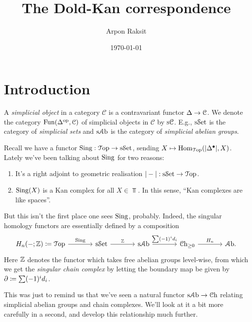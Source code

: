 


\title{The Dold-Kan correspondence}
\author{Arpon Raksit}
\date{\today}


\maketitle
\thispagestyle{fancy}


\renewcommand{\C}{\mathcal{C}}

\section{Introduction}

\begin{definition}
  A \textit{simplicial object} in a category $\C$ is a contravariant
  functor $\Simplex \to \C$. We denote the category
  $\Fun(\Simplex^\op, \C)$ of simplicial objects in $\C$ by
  $\s\C$. E.g., $\mathrm{s}{\mathcal{S}\mathrm{et}}$ is the category of \textit{simplicial sets}
  and $\mathrm{s}{\mathcal{A}\mathrm{b}}$ is the category of \textit{simplicial abelian groups}.
\end{definition}

Recall we have a functor $\operatorname{Sing} : {\mathcal{T}\mathrm{op}} \to \mathrm{s}{\mathcal{S}\mathrm{et}}$, sending $X \mapsto
\operatorname{Hom}_{\mathcal{T}\mathrm{op}}(|\Delta^\bullet|, X)$. Lately we've been talking about
$\operatorname{Sing}$ for two reasons:
\begin{enumerate}
\item It's a right adjoint to geometric realisation $|-| : \mathrm{s}{\mathcal{S}\mathrm{et}} \to
  {\mathcal{T}\mathrm{op}}$.
\item $\operatorname{Sing}(X)$ is a Kan complex for all $X \in \Top$. In this sense,
  ``Kan complexes  are like spaces''.
\end{enumerate}
But this isn't the first place one sees $\operatorname{Sing}$, probably. Indeed, the
singular homology functors are essentially defined by a composition
\[
\begin{tikzcd}[column sep = large]
  \H_n(-;\Z) \coloneqq \Top \rar{\Sing} & \s\Set \rar{\Z} & \s\Ab
  \rar{\sum (-1)^i d_i} & \Ch_{\ge 0} \rar{\H_n} & \Ab.
\end{tikzcd}
\]
Here $\mathbb{Z}$ denotes the functor which takes free abelian groups
level-wise, from which we get the \textit{singular chain complex} by
letting the boundary map be given by $\partial \coloneqq \sum (-1)^i d_i$.

This was just to remind us that we've seen a natural functor $\mathrm{s}{\mathcal{A}\mathrm{b}}
\to {\mathcal{C}\mathrm{h}}$ relating simplicial abelian groups and chain complexes. We'll
look at it a bit more carefully in a second, and develop this
relationship much further.

